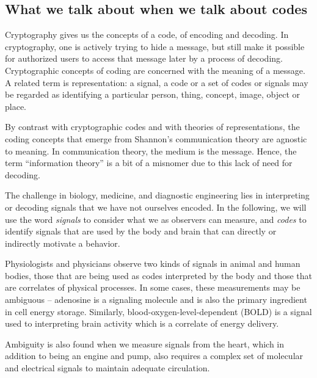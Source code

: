 \documentclass[12pt]{article}
\begin{document}
\subsection*{What we talk about when we talk about codes}

Cryptography gives us the concepts of a code, of encoding and decoding. In cryptography, one is actively trying to hide a message, but still make it possible for authorized
users to access that message later by a process of decoding. Cryptographic concepts of coding are concerned with the meaning of a message. A related term 
is representation: a signal, a code or a set of codes or signals may be regarded as identifying a particular person, thing, concept, image, object or place.

By contrast with cryptographic codes and with theories of representations, the coding concepts that emerge from Shannon’s communication
theory are agnostic to meaning.\cite{Shannon1948-ks} In communication theory, the medium is the message.
Hence, the term ``information theory'' is a bit of a misnomer due to this lack of need for decoding.


The challenge in biology, medicine, and diagnostic engineering lies in interpreting or decoding signals that we have not ourselves encoded. 
In the following, we will use the word {\em signals} to consider what we as observers can measure, and {\em codes} to identify signals that
are used by the body and brain that can directly or indirectly motivate a behavior.

Physiologists and physicians observe two kinds of signals in animal and human bodies, those that are being used as codes interpreted by the body and those that are correlates of physical
processes. In some cases, these measurements may be ambiguous -- adenosine is a signaling molecule and is also the primary ingredient in cell energy storage.
Similarly, blood-oxygen-level-dependent (BOLD) is a signal used to interpreting brain activity which is a correlate of energy delivery.

Ambiguity is also found when we measure signals from the heart, which in addition to being an engine and pump, also requires a complex set of molecular and electrical signals
to maintain adequate circulation.
\end{document}
